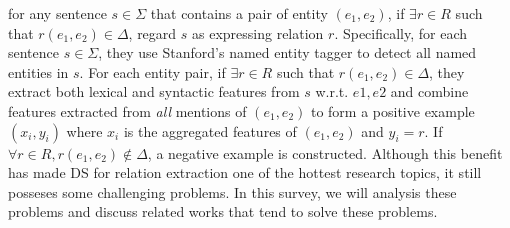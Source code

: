 \documentclass[10pt]{article} %
\theoremstyle{definition}
\theoremstyle{definition}
\begin{document}
for any sentence $s\in\Sigma$ that contains a pair of entity $(e_1,e_2)$, if $\exists{}r\in{}R$ such that $r(e_1,e_2)\in\Delta$, regard $s$ as expressing relation $r$. 
Specifically, for each sentence $s\in\Sigma$, they use Stanford's named entity tagger to detect all named entities in $s$. 
For each entity pair, if $\exists{}r\in{}R$ such that $r(e_1,e_2)\in\Delta$, they extract both lexical and syntactic features from $s$ w.r.t. $e1,e2$ and combine features extracted from \emph{all} mentions of $(e_1,e_2)$ 
to form a positive example $(x_i,y_i)$ where $x_i$ is the aggregated features of $(e_1,e_2)$ and $y_i=r$. 
If $\forall{}r\in{}R,r(e_1,e_2)\notin\Delta$, a negative example is constructed. 
Although this benefit has made DS for relation extraction one of the hottest research topics, it still posseses some challenging problems. 
In this survey, we will analysis these problems and discuss related works that tend to solve these problems. 
\end{document}
